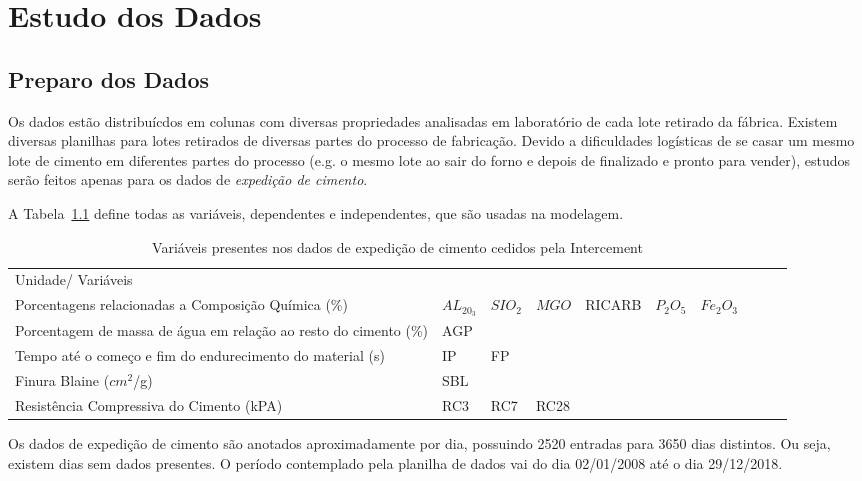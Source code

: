 \chapter{Estudo dos Dados}
\label{cap:estudodados}


\section{Preparo dos Dados}


Os dados estão distribuícdos em colunas com diversas propriedades analisadas em
laboratório de cada lote retirado da fábrica. Existem diversas planilhas para
lotes retirados de diversas partes do processo de fabricação. Devido a dificuldades logísticas de se casar um
mesmo lote de cimento em diferentes partes do processo (e.g. o mesmo lote ao
sair do forno e depois de finalizado e pronto para vender), estudos serão feitos apenas para os dados de
\textit{expedição de cimento}. 

A Tabela~\ref{tb:vars} define todas as variáveis, dependentes e independentes,
que são usadas na modelagem. 

\begin{table}[]
  \begin{tabular}{llllllllll}
    Unidade/ Variáveis                                               &       &      &      &        &      &            \\
    Porcentagens relacionadas a Composição Química (\%)              & $AL_20_3$ & $SIO_2$ & $MGO$  & RICARB & $P_2O_5$ & $Fe_2O_3$ \\
    Porcentagem de massa de água em relação ao resto do cimento (\%) & AGP   &      &      &        &      &            \\
    Tempo até o começo e fim do endurecimento do material (s)        & IP    & FP   &      &        &      &            \\
    Finura Blaine ($cm^2$/g)                      & SBL   &      &      &        &      &            \\
    Resistência Compressiva do Cimento (kPA)                         & RC3   & RC7  & RC28 &        &      &           
  \end{tabular}
  \caption{Variáveis presentes nos dados de expedição de cimento cedidos pela Intercement}
  \label{tb:vars}
\end{table}

Os dados de expedição de cimento são anotados aproximadamente por dia, possuindo 2520
entradas para 3650 dias distintos. Ou seja, existem dias sem dados presentes. O
período contemplado pela planilha de dados vai do dia 02/01/2008 até o dia 29/12/2018.

